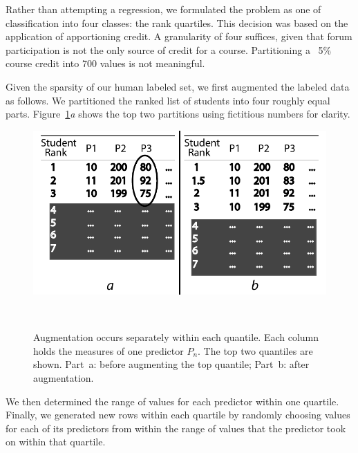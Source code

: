 


Rather than attempting a regression, we formulated the problem as one
of classification into four classes: the rank quartiles. This decision
was based on the application of apportioning credit. A granularity of
four suffices, given that forum participation is not the only source
of credit for a course. Partitioning a ~5\% course credit into 700
values is not meaningful. 

Given the sparsity of our human labeled set, we first augmented the
labeled data as follows. We partitioned the ranked list of students
into four roughly equal parts. Figure~\ref{fig:augment}{\em a} shows the
top two partitions using fictitious numbers for clarity.
\begin{figure}[H] 
\centering
  \includegraphics[width=0.8\columnwidth]{Figs/augmentation.pdf}
  \caption{Augmentation occurs separately within each quantile. Each column
    holds the measures of one predictor $P_n$. The top two quantiles
    are shown. Part~a: before augmenting the top quantile; Part~b:
    after augmentation.}  ~\label{fig:augment}
\end{figure}
\vspace{-2.5cm}
We then determined the range of values for each predictor within one
quartile. Finally, we generated new rows within each quartile by
randomly choosing values for each of its predictors from within the
range of values that the predictor took on within that quartile.


